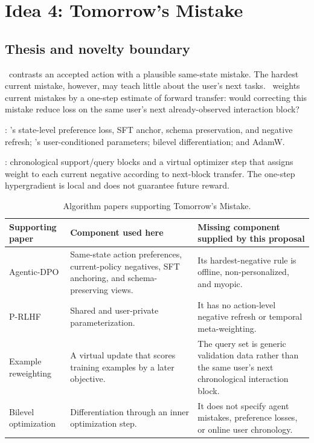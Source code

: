\section{Idea 4: Tomorrow's Mistake}
\label{sec:tomorrows-mistake}

\subsection{Thesis and novelty boundary}

\agenticdpo\ contrasts an accepted action with a plausible same-state mistake.
The hardest current mistake, however, may teach little about the user's next
tasks.  \tomorrow\ weights current mistakes by a one-step estimate of forward
transfer: would correcting this mistake reduce loss on the same user's next
already-observed interaction block?

\Inherited: \agenticdpo's state-level preference loss, SFT anchor, schema
preservation, and negative refresh; \prlhf's user-conditioned parameters;
bilevel differentiation; and AdamW.

\Proposed: chronological support/query blocks and a virtual optimizer step
that assigns weight to each current negative according to next-block transfer.
The one-step hypergradient is local and does not guarantee future reward.

\begin{table}[t]
  \centering
  \caption{Algorithm papers supporting Tomorrow's Mistake.}
  \label{tab:tomorrow-support}
  \begin{tabularx}{\textwidth}{@{}L{0.24\textwidth}Y Y@{}}
    \toprule
    Supporting paper & Component used here & Missing component supplied by this proposal \\
    \midrule
    Agentic-DPO \citep{chen2026agenticdpo} &
    Same-state action preferences, current-policy negatives, SFT anchoring,
    and schema-preserving views. &
    Its hardest-negative rule is offline, non-personalized, and myopic. \\
    P-RLHF \citep{li2024personalized} &
    Shared and user-private parameterization. &
    It has no action-level negative refresh or temporal meta-weighting. \\
    Example reweighting \citep{ren2018learning} &
    A virtual update that scores training examples by a later objective. &
    The query set is generic validation data rather than the same user's next
    chronological interaction block. \\
    Bilevel optimization \citep{franceschi2018bilevel} &
    Differentiation through an inner optimization step. &
    It does not specify agent mistakes, preference losses, or online user
    chronology. \\
    \bottomrule
  \end{tabularx}
\end{table}

